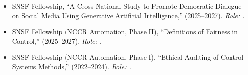 \documentclass[10pt, a4paper]{article}
\newcommand{\me}[1]{\robotoMedium{#1}}
\newcommand{\cvsection}[1]{%
    \vspace{10pt}%
    {\large\color{sectionColor}\robotoMedium{#1}}%
    \par\vspace{-5pt}\noindent{\color{sectionColor}\rule{\linewidth}{0.5pt}}%
    \vspace{0pt}%
}
\begin{document}

\normalsize

\cvsection{GRANTS}
\begin{itemize}[leftmargin=*, nosep]
\item SNSF Fellowship, ``A Cross-National Study to Promote Democratic Dialogue on Social Media Using Generative Artificial Intelligence,''  (2025--2027). \emph{Role: .}
\item SNSF Fellowship (NCCR Automation, Phase II), ``Definitions of Fairness in Control,''  (2025--2027). \emph{Role: .}
\item SNSF Fellowship (NCCR Automation, Phase I), ``Ethical Auditing of Control Systems Methods,''   (2022--2024). \emph{Role: .}
\end{itemize}
\end{document}
